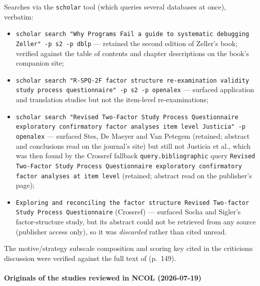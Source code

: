 Searches via the \texttt{scholar} tool (which queries several databases at
once), verbatim:
\begin{itemize}
  \item \texttt{scholar search "Why Programs Fail a guide to systematic
    debugging Zeller" -p s2 -p dblp} --- retained the second edition of
    Zeller's book; verified against the table of contents and chapter
    descriptions on the book's companion site;
  \item \texttt{scholar search "R-SPQ-2F factor structure re-examination
    validity study process questionnaire" -p s2 -p openalex} --- surfaced
    application and translation studies but not the item-level
    re-examinations;
  \item \texttt{scholar search "Revised Two-Factor Study Process
    Questionnaire exploratory confirmatory factor analyses item level
    Justicia" -p openalex} --- surfaced Stes, De Maeyer and Van Petegem
    (retained; abstract and conclusions read on the journal's site) but
    still not Justicia et al., which was then found by the Crossref
    fallback \texttt{query.bibliographic} query \texttt{Revised Two-Factor
    Study Process Questionnaire exploratory confirmatory factor analyses at
    item level} (retained; abstract read on the publisher's page);
  \item \texttt{Exploring and reconciling the factor structure Revised
    Two-factor Study Process Questionnaire} (Crossref) --- surfaced Socha
    and Sigler's factor-structure study, but its abstract could not be
    retrieved from any source (publisher access only), so it was
    \emph{discarded} rather than cited unread.
\end{itemize}
The motive/strategy subscale composition and scoring key cited in the
criticisms discussion were verified against the full text of
\textcite{RSPQ2F} (p.~149).

\paragraph{Originals of the studies reviewed in NCOL (2026-07-19)}

